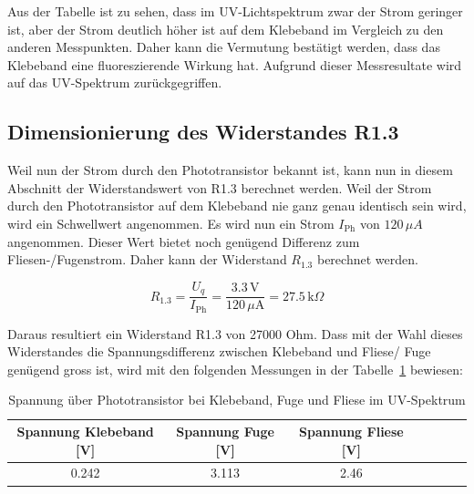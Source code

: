 \documentclass[main.tex]{subfiles} %
\begin{document}
Aus der Tabelle ist zu sehen, dass im UV-Lichtspektrum zwar der Strom geringer ist, aber der Strom deutlich höher ist auf dem Klebeband im 
Vergleich zu den anderen Messpunkten. Daher kann die Vermutung bestätigt werden, dass das Klebeband eine fluoreszierende Wirkung hat. Aufgrund
dieser Messresultate wird auf das UV-Spektrum zurückgegriffen.


\subsection{Dimensionierung des Widerstandes R1.3}
Weil nun der Strom durch den Phototransistor bekannt ist, kann nun in diesem Abschnitt der Widerstandswert von R1.3 berechnet werden. Weil der Strom
durch den Phototransistor auf dem Klebeband nie ganz genau identisch sein wird, wird ein Schwellwert angenommen. Es wird nun ein Strom $I_{\text{Ph}}$ von $120 \, \mu A$
angenommen. Dieser Wert bietet noch genügend Differenz zum Fliesen-/Fugenstrom. Daher kann der Widerstand $R_{1.3}$ berechnet werden.

\[
    R_{1.3} = \frac{U_q}{I_{\text{Ph}}} = \frac{3.3 \, \text{V}}{120 \, \mu \text{A}} = 27.5 \, \text{k}\Omega
\]


Daraus resultiert ein Widerstand R1.3 von 27000 Ohm. Dass mit der Wahl dieses Widerstandes die Spannungsdifferenz zwischen Klebeband und Fliese/ Fuge
genügend gross ist, wird mit den folgenden Messungen in der Tabelle~\ref{tab:Spannungsmessungen} bewiesen:

\begin{table}[h]                                    
    \centering
    \begin{tabular}{|c|c|c|c|c|c|c|}                        
        \hline
             \textbf{Spannung Klebeband [V]}        & \textbf{Spannung Fuge [V]}    & \textbf{Spannung Fliese [V]}\\ \hline
             0.242                                   & 3.113                          & 2.46                       \\ \hline

        \end{tabular}
\caption{Spannung über Phototransistor bei Klebeband, Fuge und Fliese im UV-Spektrum}
\label{tab:Spannungsmessungen}
\end{table}

\end{document}
